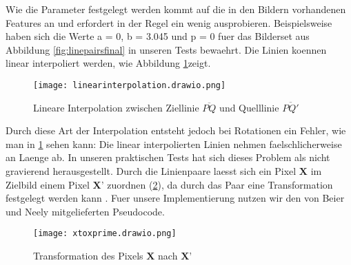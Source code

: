 Wie die Parameter festgelegt werden kommt auf die in den Bildern
vorhandenen Features an und erfordert in der Regel ein wenig
ausprobieren. Beispielsweise haben sich die Werte 
a = 0, b = 3.045 und p = 0 fuer das Bilderset aus Abbildung
\ref{fig:linepairsfinal} in unseren Tests bewaehrt.
Die Linien koennen linear interpoliert werden, wie Abbildung \ref{fig:linearinterpolation}zeigt. 
\begin{figure}[htb]
	\centering
	\texttt{[image: linearinterpolation.drawio.png]}
	\caption{Lineare Interpolation zwischen Ziellinie $\overline{PQ}$ und Quelllinie $\overline{PQ'}$}
	\label{fig:linearinterpolation}
\end{figure}
Durch diese Art der Interpolation entsteht jedoch bei
Rotationen ein Fehler, wie man in \ref{fig:linearinterpolation} sehen kann: Die linear
interpolierten Linien nehmen faelschlicherweise
an Laenge ab. In unseren praktischen Tests hat sich
dieses Problem als nicht gravierend herausgestellt. Durch die Linienpaare
laesst sich ein Pixel $\textbf{X}$ im Zielbild einem Pixel $\textbf{X'}$ zuordnen
(\ref{fig:xtoxprime}),
da durch das Paar eine Transformation festgelegt werden kann \cite{beierneely}.
Fuer unsere Implementierung nutzen wir den von Beier und Neely
mitgelieferten Pseudocode.

\begin{figure}[htb]
	\centering
	\texttt{[image: xtoxprime.drawio.png]}
	\caption{Transformation des Pixels $\textbf{X}$ nach $\textbf{X'}$}
	\label{fig:xtoxprime}
\end{figure}

\clearpage

